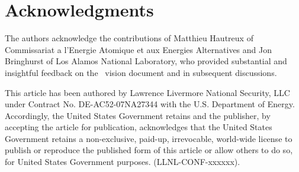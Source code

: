\section {Acknowledgments}
The authors acknowledge the contributions of Matthieu Hautreux
of Commissariat a l'Energie Atomique et aux Energies Alternatives
and Jon Bringhurst of Los Alamos National Laboratory, who provided
substantial and insightful feedback on the \flux\ vision document
and in subsequent discussions.
\ifcomments
{}
\fi

This article has been authored by Lawrence Livermore National Security, LLC
under Contract No. DE-AC52-07NA27344 with the U.S. Department of
Energy. Accordingly, the United States Government retains and the publisher,
by accepting the article for publication, acknowledges that the United States
Government retains a non-exclusive, paid-up, irrevocable, world-wide license
to publish or reproduce the published form of this article or allow others to
do so, for United States Government purposes. (LLNL-CONF-xxxxxx).
